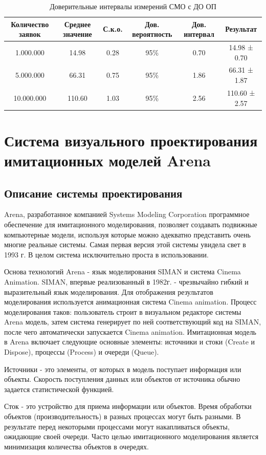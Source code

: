 \documentclass[a4paper,14pt]{report} %
\begin{document}
\begin{table}[h!]
\caption{Доверительные интервалы измерений СМО с ДО ОП}
\begin{tabular}{|c|c|c|c|c|c|}
\hline
 Количество заявок & Среднее значение & С.к.о. & Дов. вероятность & Дов. интервал & Результат\\
\hline
1.000.000 & 14.98 & 0.28 & 95\% & 0.70 & 14.98 ± 0.70 \\
\hline
5.000.000 & 66.31 & 0.75 & 95\% & 1.86 & 66.31 ± 1.87 \\
\hline
10.000.000 & 110.60 & 1.03 & 95\% &2.56 & 110.60 ± 2.57 \\
\hline
\end{tabular}
\end{table} 


\section{Система визуального проектирования имитационных моделей Arena}
\subsection{Описание системы проектирования}
Arena, разработанное компанией Systems Modeling Corporation программное обеспечение для имитационного моделирования, позволяет создавать подвижные компьютерные модели, используя которые можно адекватно представить очень многие реальные системы. Самая первая версия этой системы увидела свет в 1993 г. В целом система исключительно проста в использовании. 

Основа технологий Arena - язык моделирования SIMAN и система Cinema Animation. SIMAN, впервые реализованный в 1982г. - чрезвычайно гибкий и выразительный язык моделирования. Для отображения результатов моделирования используется анимационная система Cinema animation. Процесс моделирования таков: пользователь строит в визуальном редакторе системы Arena модель, затем система генерирует по ней соответствующий код на SIMAN, после чего автоматически запускается Cinema animation. 
Имитационная модель в Arena включает следующие основные эле­менты: источники и стоки (Create и Dispose), процессы (Process) и очереди (Queue).

Источники - это элементы, от которых в модель поступает информация или объекты. Скорость поступления данных или объектов от источ­ника обычно задается статистической функцией.

Сток - это устройство для приема информации или объектов. Время обработки объектов (производительность) в разных процессах могут быть разными. В результате перед некоторыми процессами могут накапливаться
объекты, ожидающие своей очереди. Часто целью имитационного модели­рования является минимизация количества объектов в очередях.
\end{document}
